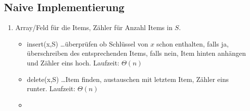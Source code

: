 \subsection{Naive Implementierung}
\begin{enumerate}
	\item Array/Feld für die Items, Zähler für Anzahl Items in $S$.
	\begin{itemize}
		\item[] insert(x,S) \dots überprüfen ob Schlüssel von $x$ schon enthalten, falls ja, überschreiben des entsprechenden Items, falls nein, Item hinten anhängen und Zähler eins hoch. Laufzeit: $\Theta(n)$
		\item[]  delete(x,S) \dots Item finden, austauschen mit letztem Item, Zähler eins runter. Laufzeit: $\Theta(n)$
		\item[] %
	\end{itemize}
\end{enumerate}
